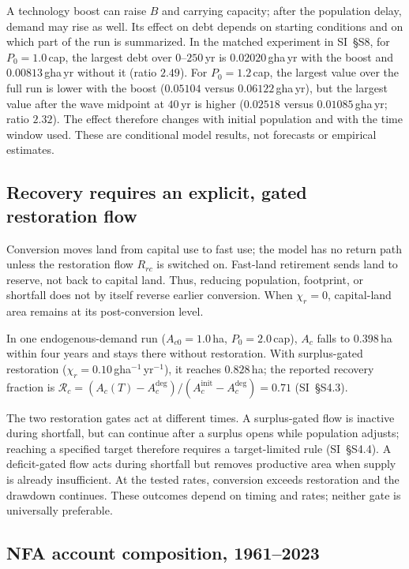 A technology boost can raise $B$ and carrying capacity; after the population delay, demand may rise as well. Its effect on debt depends on starting conditions and on which part of the run is summarized. In the matched experiment in SI~\S S8, for $P_0=1.0$\,cap, the largest debt over $0$--$250$\,yr is $0.02020$\,gha\,yr with the boost and $0.00813$\,gha\,yr without it (ratio $2.49$). For $P_0=1.2$\,cap, the largest value over the full run is lower with the boost ($0.05104$ versus $0.06122$\,gha\,yr), but the largest value after the wave midpoint at $40$\,yr is higher ($0.02518$ versus $0.01085$\,gha\,yr; ratio $2.32$). The effect therefore changes with initial population and with the time window used. These are conditional model results, not forecasts or empirical estimates.

\subsection{Recovery requires an explicit, gated restoration flow}\label{sec:recovery}

Conversion moves land from capital use to fast use; the model has no return path unless the restoration flow $R_{rc}$ is switched on. Fast-land retirement sends land to reserve, not back to capital land. Thus, reducing population, footprint, or shortfall does not by itself reverse earlier conversion. When $\chi_r=0$, capital-land area remains at its post-conversion level.

In one endogenous-demand run ($A_{c0}=1.0$\,ha, $P_0=2.0$\,cap), $A_c$ falls to $0.398$\,ha within four years and stays there without restoration. With surplus-gated restoration ($\chi_r=0.10$\,gha$^{-1}$\,yr$^{-1}$), it reaches $0.828$\,ha; the reported recovery fraction is $\mathcal R_c=(A_c(T)-A_c^{\mathrm{deg}})/(A_c^{\mathrm{init}}-A_c^{\mathrm{deg}})=0.71$ (SI~\S S4.3).

The two restoration gates act at different times. A surplus-gated flow is inactive during shortfall, but can continue after a surplus opens while population adjusts; reaching a specified target therefore requires a target-limited rule (SI~\S S4.4). A deficit-gated flow acts during shortfall but removes productive area when supply is already insufficient. At the tested rates, conversion exceeds restoration and the drawdown continues. These outcomes depend on timing and rates; neither gate is universally preferable.

\subsection{NFA account composition, 1961--2023}\label{sec:empirical}

